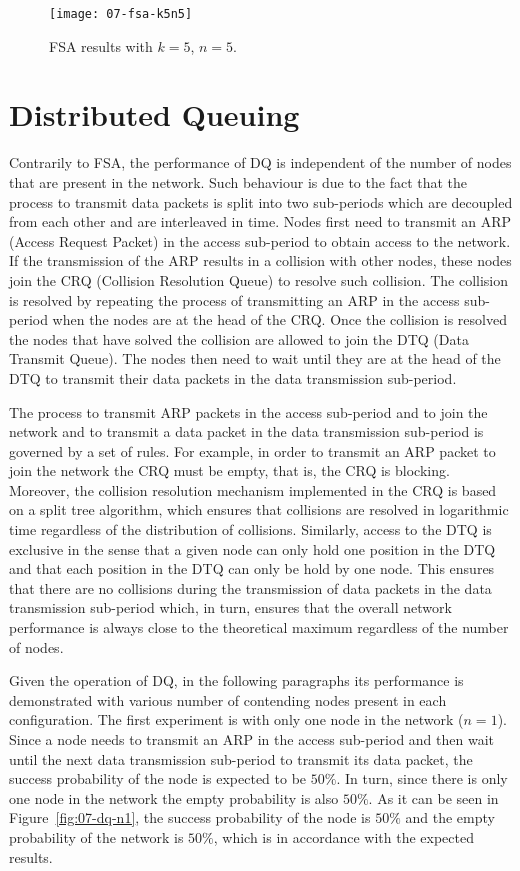 \begin{figure}[!ht]
    \centering
	\texttt{[image: 07-fsa-k5n5]}
    \caption{FSA results with $k=5$, $n=5$.}
    \label{fig:07-fsa-k5n5}
\end{figure}

\section{Distributed Queuing}
Contrarily to FSA, the performance of DQ is independent of the number of nodes that are present in the network. Such behaviour is due to the fact that the process to transmit data packets is split into two sub-periods which are decoupled from each other and are interleaved in time. Nodes first need to transmit an ARP (Access Request Packet) in the access sub-period to obtain access to the network. If the transmission of the ARP results in a collision with other nodes, these nodes join the CRQ (Collision Resolution Queue) to resolve such collision. The collision is resolved by repeating the process of transmitting an ARP in the access sub-period when the nodes are at the head of the CRQ. Once the collision is resolved the nodes that have solved the collision are allowed to join the DTQ (Data Transmit Queue). The nodes then need to wait until they are at the head of the DTQ to transmit their data packets in the data transmission sub-period.

The process to transmit ARP packets in the access sub-period and to join the network and to transmit a data packet in the data transmission sub-period is governed by a set of rules. For example, in order to transmit an ARP packet to join the network the CRQ must be empty, that is, the CRQ is blocking. Moreover, the collision resolution mechanism implemented in the CRQ is based on a split tree algorithm, which ensures that collisions are resolved in logarithmic time regardless of the distribution of collisions. Similarly, access to the DTQ is exclusive in the sense that a given node can only hold one position in the DTQ and that each position in the DTQ can only be hold by one node. This ensures that there are no collisions during the transmission of data packets in the data transmission sub-period which, in turn, ensures that the overall network performance is always close to the theoretical maximum regardless of the number of nodes.

Given the operation of DQ, in the following paragraphs its performance is demonstrated with various number of contending nodes present in each configuration. The first experiment is with only one node in the network ($n=1$). Since a node needs to transmit an ARP in the access sub-period and then wait until the next data transmission sub-period to transmit its data packet, the success probability of the node is expected to be $50\%$. In turn, since there is only one node in the network the empty probability is also $50\%$. As it can be seen in Figure~\ref{fig:07-dq-n1}, the success probability of the node is $50\%$ and the empty probability of the network is $50\%$, which is in accordance with the expected results.

